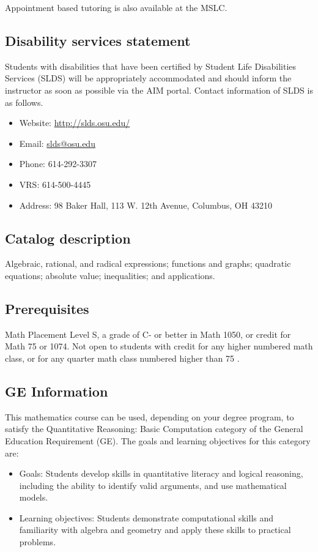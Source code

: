 \documentclass{ximera}
\begin{document}
Appointment based tutoring is also available at the MSLC.

\subsection*{Disability services statement}
Students with disabilities that have been certified by Student Life Disabilities Services (SLDS) will be appropriately accommodated and should inform the instructor as soon as possible via the AIM portal. Contact information of SLDS is as follows.

\begin{itemize}
  \item Website: \href{http://slds.osu.edu/}{http://slds.osu.edu/}
  \item Email: \href{mailto:slds@osu.edu}{slds@osu.edu}
  \item Phone: 614-292-3307
  \item VRS: 614-500-4445
  \item Address: 98 Baker Hall, 113 W. 12th Avenue, Columbus, OH 43210
\end{itemize}

\subsection*{Catalog description}
Algebraic, rational, and radical expressions; functions and graphs; quadratic equations; absolute value; inequalities; and applications.

\subsection*{Prerequisites}
Math Placement Level S, a grade of C- or better in Math 1050, or credit for Math 75 or 1074. Not open to students with credit for any higher numbered math class, or for any quarter math class numbered higher than 75 .

\subsection*{GE Information}
This mathematics course can be used, depending on your degree program, to satisfy the Quantitative Reasoning: Basic Computation category of the General Education Requirement (GE). The goals and learning objectives for this category are:

\begin{itemize}
  \item Goals: Students develop skills in quantitative literacy and logical reasoning, including the ability to identify valid arguments, and use mathematical models.
  \item Learning objectives: Students demonstrate computational skills and familiarity with algebra and geometry and apply these skills to practical problems.
\end{itemize}
\end{document}
